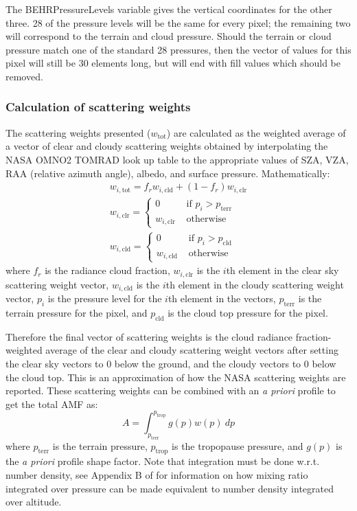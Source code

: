 \documentclass[12pt]{article}
\begin{document}
	The BEHRPressureLevels variable gives the vertical coordinates for the other three.  28 of the pressure levels will be the same for every pixel; the remaining two will correspond to the terrain and cloud pressure. Should the terrain or cloud pressure match one of the standard 28 pressures, then the vector of values for this pixel will still be 30 elements long, but will end with fill values which should be removed.
	
	\subsubsection{Calculation of scattering weights}
	The scattering weights presented ($w_{\mathrm{tot}}$) are calculated as the weighted average of a vector of clear and cloudy scattering weights obtained by interpolating the NASA OMNO2 TOMRAD look up table to the appropriate values of SZA, VZA, RAA (relative azimuth angle), albedo, and surface pressure. Mathematically:
	\begin{align}
		w_{i, \mathrm{tot}} = f_r w_{i, \mathrm{cld}} + (1 - f_r) w_{i, \mathrm{clr}} \label{eqn-pubSW}\\
		w_{i, \mathrm{clr}} = \left\lbrace 
			\begin{matrix}
				0 & \text{ if } p_i > p_\mathrm{terr} \\
				w_{i, \mathrm{clr}} & \text{ otherwise }
			\end{matrix}\right. \\
		w_{i, \mathrm{cld}} = \left\lbrace 
			\begin{matrix} 
				0 & \text{ if } p_i > p_\mathrm{cld} \\
				w_{i, \mathrm{cld}} & \text{ otherwise }
			\end{matrix}\right. \label{eqn-cldSW}
	\end{align}
	where $f_r$ is the radiance cloud fraction, $w_{i, \mathrm{clr}}$ is the $i$th element in the clear sky scattering weight vector, $w_{i, \mathrm{cld}}$ is the $i$th element in the cloudy scattering weight vector, $p_i$ is the pressure level for the $i$th element in the vectors, $p_\mathrm{terr}$ is the terrain pressure for the pixel, and $p_\mathrm{cld}$ is the cloud top pressure for the pixel.
	
	Therefore the final vector of scattering weights is the cloud radiance fraction-weighted average of the clear and cloudy scattering weight vectors after setting the clear sky vectors to 0 below the ground, and the cloudy vectors to 0 below the cloud top.  This is an approximation of how the NASA scattering weights are reported.  These scattering weights can be combined with an \emph{a priori}  profile to get the total AMF as:
	\begin{equation}
		A = \int_{p_\mathrm{terr}}^{p_\mathrm{trop}} g(p) w(p) \: dp
	\end{equation}
	where $p_\mathrm{terr}$ is the terrain pressure, $p_\mathrm{trop}$ is the tropopause pressure, and $g(p)$ is the \emph{a priori} profile shape factor. Note that integration must be done w.r.t. number density, see Appendix B of \citet{ziemka01} for information on how mixing ratio integrated over pressure can be made equivalent to number density integrated over altitude.
	
\end{document}
